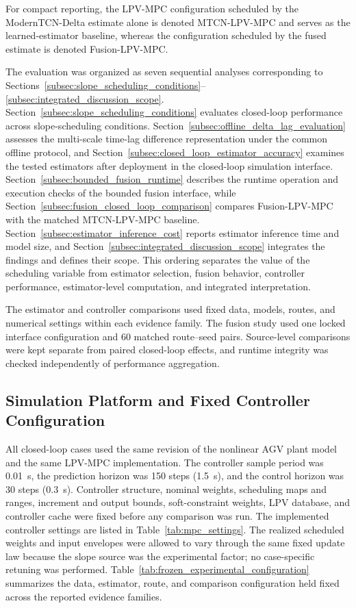 \documentclass{ieeeaccess}
\begin{document}
For compact reporting, the LPV-MPC configuration scheduled by the ModernTCN-Delta estimate alone is denoted MTCN-LPV-MPC and serves as the learned-estimator baseline, whereas the configuration scheduled by the fused estimate is denoted Fusion-LPV-MPC.

The evaluation was organized as seven sequential analyses corresponding to Sections~\ref{subsec:slope_scheduling_conditions}--\ref{subsec:integrated_discussion_scope}. Section~\ref{subsec:slope_scheduling_conditions} evaluates closed-loop performance across slope-scheduling conditions. Section~\ref{subsec:offline_delta_lag_evaluation} assesses the multi-scale time-lag difference representation under the common offline protocol, and Section~\ref{subsec:closed_loop_estimator_accuracy} examines the tested estimators after deployment in the closed-loop simulation interface. Section~\ref{subsec:bounded_fusion_runtime} describes the runtime operation and execution checks of the bounded fusion interface, while Section~\ref{subsec:fusion_closed_loop_comparison} compares Fusion-LPV-MPC with the matched MTCN-LPV-MPC baseline. Section~\ref{subsec:estimator_inference_cost} reports estimator inference time and model size, and Section~\ref{subsec:integrated_discussion_scope} integrates the findings and defines their scope. This ordering separates the value of the scheduling variable from estimator selection, fusion behavior, controller performance, estimator-level computation, and integrated interpretation.

The estimator and controller comparisons used fixed data, models, routes, and numerical settings within each evidence family. The fusion study used one locked interface configuration and 60 matched route--seed pairs. Source-level comparisons were kept separate from paired closed-loop effects, and runtime integrity was checked independently of performance aggregation.

\subsection{Simulation Platform and Fixed Controller Configuration}

All closed-loop cases used the same revision of the nonlinear AGV plant model and the same LPV-MPC implementation. The controller sample period was 0.01~s, the prediction horizon was 150 steps (1.5~s), and the control horizon was 30 steps (0.3~s). Controller structure, nominal weights, scheduling maps and ranges, increment and output bounds, soft-constraint weights, LPV database, and controller cache were fixed before any comparison was run. The implemented controller settings are listed in Table~\ref{tab:mpc_settings}. The realized scheduled weights and input envelopes were allowed to vary through the same fixed update law because the slope source was the experimental factor; no case-specific retuning was performed. Table~\ref{tab:frozen_experimental_configuration} summarizes the data, estimator, route, and comparison configuration held fixed across the reported evidence families.
\end{document}

